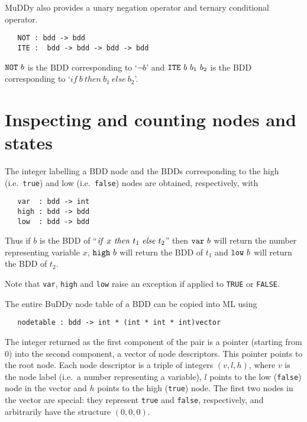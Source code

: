 \documentclass[12pt]{article}
\newcommand{\bnind}[1]{\index[MLbn]{\texttt{#1}}}
\renewcommand{\t}[1]{\mbox{\tt #1}}
\newcommand{\Buddy}{BuDDy\xspace}
\newcommand{\Muddy}{MuDDy\xspace}
\begin{document}
\Muddy{} also provides a unary negation operator and ternary conditional operator.

\begin{verbatim}
   NOT : bdd -> bdd
   ITE :  bdd -> bdd -> bdd -> bdd
\end{verbatim}\bnind{NOT}\bnind{ITE}

$\t{NOT}~b$ is the BDD corresponding to  `$\neg b$' and $\t{ITE}~b~b_1~b_2$ is the BDD corresponding
to `$if~b~then~b_1~else~b_2$'.




\section{Inspecting and counting nodes and states}

The integer labelling a BDD node and the BDDs corresponding to the high
(i.e.~{\t{true}}) and low (i.e.~{\t{false}}) nodes are obtained,
respectively, with

\begin{verbatim}
   var  : bdd -> int
   high : bdd -> bdd
   low  : bdd -> bdd
\end{verbatim}\bnind{var}\bnind{high}\bnind{low}

Thus if $b$ is the BDD of ``${\it{if}}~x~{\it{then}}~t_1~{\it{else}}~t_2$''
then $\t{var}~b$ will return the number representing variable $x$,
$\t{high}~b$ will return the BDD of $t_1$ and $\t{low}~b$ will return
the BDD of $t_2$.

Note that \t{var}, \t{high} and \t{low} raise an exception if applied
to \t{TRUE} or \t{FALSE}.

The entire \Buddy{} node table of a BDD can be copied into ML using

\begin{verbatim}
   nodetable : bdd -> int * (int * int * int)vector
\end{verbatim}\bnind{nodetable}

The integer returned as the first component of the pair is a pointer
(starting from 0) into the second component, a vector of node
descriptors. This pointer points to the root node. Each node
descriptor is a triple of integers $(v,l,h)$, where $v$ is the node
label (i.e.~a number representing a variable), $l$ points to the low
({\t{false}}) node in the vector and $h$ points to the high
({\t{true}}) node. The first two nodes in the vector are special:
they represent {\t{true}} and {\t{false}}, respectively, and arbitrarily have
the structure $(0,0,0)$.
\end{document}
